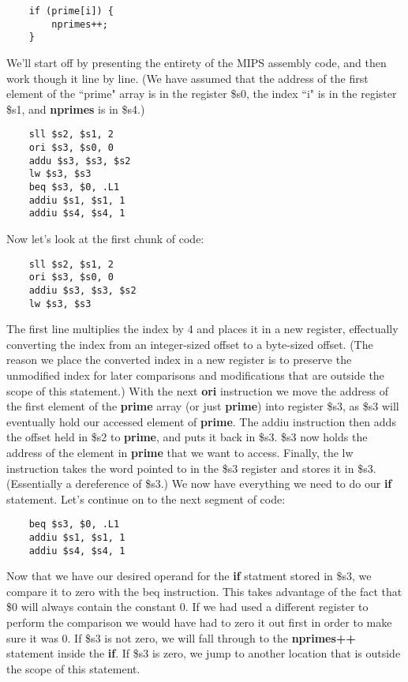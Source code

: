 \documentclass[11pt]{article}
\begin{document}
\begin{verbatim}
    if (prime[i]) {
        nprimes++;
    }
\end{verbatim}

We'll start off by presenting the entirety of the MIPS assembly code, and then work though it line by line. (We have assumed that the address of the first element of the ``prime" array is in the register \$s0, the index ``i" is in the register \$s1, and \textbf{nprimes} is in \$s4.)

\begin{verbatim}
    sll $s2, $s1, 2
    ori $s3, $s0, 0
    addu $s3, $s3, $s2
    lw $s3, $s3
    beq $s3, $0, .L1
    addiu $s1, $s1, 1
    addiu $s4, $s4, 1
\end{verbatim}

Now let's look at the first chunk of code:

\begin{verbatim}
    sll $s2, $s1, 2
    ori $s3, $s0, 0
    addiu $s3, $s3, $s2
    lw $s3, $s3
\end{verbatim}

The first line multiplies the index by 4 and places it in a new register, effectually converting the index from an integer-sized offset to a byte-sized offset. (The reason we place the converted index in a new register is to preserve the unmodified index for later comparisons and modifications that are outside the scope of this statement.) With the next \textbf{ori} instruction we move the address of the first element of the \textbf{prime} array (or just \textbf{prime}) into register \$s3, as \$s3 will eventually hold our accessed element of \textbf{prime}. The addiu instruction then adds the offset held in \$s2 to \textbf{prime}, and puts it back in \$s3. \$s3 now holds the address of the element in \textbf{prime} that we want to access. Finally, the lw instruction takes the word pointed to in the \$s3 register and stores it in \$s3. (Essentially a dereference of \$s3.) We now have everything we need to do our \textbf{if} statement. Let's continue on to the next segment of code:

\begin{verbatim}
    beq $s3, $0, .L1
    addiu $s1, $s1, 1
    addiu $s4, $s4, 1
\end{verbatim}

Now that we have our desired operand for the \textbf{if} statment stored in \$s3, we compare it to zero with the beq instruction. This takes advantage of the fact that \$0 will always contain the constant 0. If we had used a different register to perform the comparison we would have had to zero it out first in order to make sure it was 0. If \$s3 is not zero, we will fall through to the \textbf{nprimes++} statement inside the \textbf{if}. If \$s3 is zero, we jump to another location that is outside the scope of this statement. 
\end{document}
